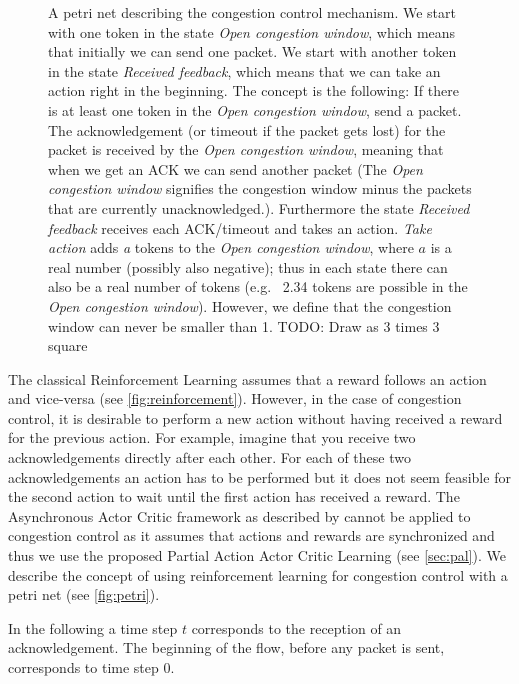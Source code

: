 \documentclass[sigconf]{acmart}
\newcommand\note[2]{{\color{#1}#2}}
\newcommand\todo[1]{{\note{red}{TODO: #1}}}
\begin{document}
\begin{figure}
\begin{tikzpicture}[node distance=\nodedistance,>=stealth',bend angle=45,auto]
\end{tikzpicture}

\caption{A petri net describing the congestion control mechanism. We start with one token in the state \textit{Open congestion window}, which means that initially we can send one packet. We start with another token in the state \textit{Received feedback}, which means that we can take an action right in the beginning. The concept is the following: If there is at least one token in the \textit{Open congestion window}, send a packet. The acknowledgement (or timeout if the packet gets lost) for the packet is received by the \textit{Open congestion window}, meaning that when we get an ACK we can send another packet (The \textit{Open congestion window} signifies the congestion window minus the packets that are currently unacknowledged.). Furthermore the state \textit{Received feedback} receives each ACK/timeout and takes an action. \textit{Take action} adds \textit{a} tokens to the \textit{Open congestion window}, where $a$ is a real number (possibly also negative); thus in each state there can also be a real number of tokens (e.g.~ 2.34 tokens are possible in the \textit{Open congestion window}). However, we define that the congestion window can never be smaller than 1. \todo{Draw as 3 times 3 square}}
\label{fig:petri}
\end{figure}

The classical Reinforcement Learning assumes that a reward follows an action and vice-versa (see \autoref{fig:reinforcement}). However, in the case of congestion control, it is desirable to perform a new action without having received a reward for the previous action. For example, imagine that you receive two acknowledgements directly after each other. For each of these two acknowledgements an action has to be performed but it does not seem feasible for the second action to wait until the first action has received a reward. The Asynchronous Actor Critic framework as described by \cite{mnih_asynchronous_2016} cannot be applied to congestion control as it assumes that actions and rewards are synchronized and thus we use the proposed Partial Action Actor Critic Learning (see \autoref{sec:pal}). We describe the concept of using reinforcement learning for congestion control with a petri net (see \autoref{fig:petri}).

In the following a time step $t$ corresponds to the reception of an acknowledgement. The beginning of the flow, before any packet is sent, corresponds to time step $0$.
\end{document}
